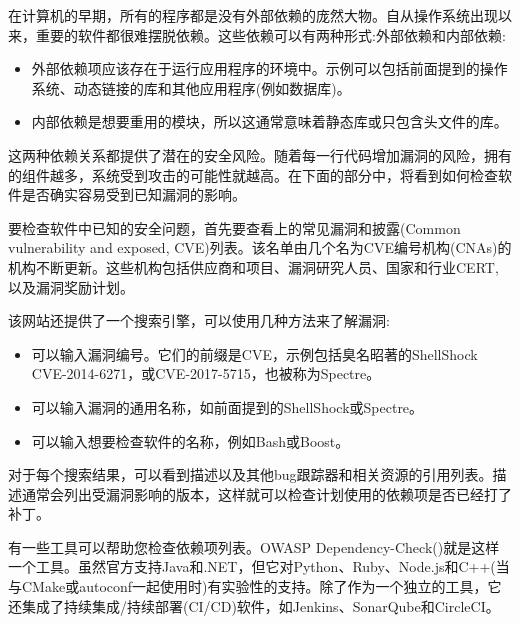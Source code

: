 
在计算机的早期，所有的程序都是没有外部依赖的庞然大物。自从操作系统出现以来，重要的软件都很难摆脱依赖。这些依赖可以有两种形式:外部依赖和内部依赖:

\begin{itemize}
\item 
外部依赖项应该存在于运行应用程序的环境中。示例可以包括前面提到的操作系统、动态链接的库和其他应用程序(例如数据库)。

\item 
内部依赖是想要重用的模块，所以这通常意味着静态库或只包含头文件的库。
\end{itemize}

这两种依赖关系都提供了潜在的安全风险。随着每一行代码增加漏洞的风险，拥有的组件越多，系统受到攻击的可能性就越高。在下面的部分中，将看到如何检查软件是否确实容易受到已知漏洞的影响。


要检查软件中已知的安全问题，首先要查看上的常见漏洞和披露(Common vulnerability and exposed, CVE)列表。该名单由几个名为CVE编号机构(CNAs)的机构不断更新。这些机构包括供应商和项目、漏洞研究人员、国家和行业CERT,以及漏洞奖励计划。

该网站还提供了一个搜索引擎，可以使用几种方法来了解漏洞:

\begin{itemize}
\item 
可以输入漏洞编号。它们的前缀是CVE，示例包括臭名昭著的ShellShock CVE-2014-6271，或CVE-2017-5715，也被称为Spectre。

\item 
可以输入漏洞的通用名称，如前面提到的ShellShock或Spectre。

\item 
可以输入想要检查软件的名称，例如Bash或Boost。
\end{itemize}

对于每个搜索结果，可以看到描述以及其他bug跟踪器和相关资源的引用列表。描述通常会列出受漏洞影响的版本，这样就可以检查计划使用的依赖项是否已经打了补丁。


有一些工具可以帮助您检查依赖项列表。OWASP Dependency-Check()就是这样一个工具。虽然官方支持Java和.NET，但它对Python、Ruby、Node.js和C++(当与CMake或autoconf一起使用时)有实验性的支持。除了作为一个独立的工具，它还集成了持续集成/持续部署(CI/CD)软件，如Jenkins、SonarQube和CircleCI。

